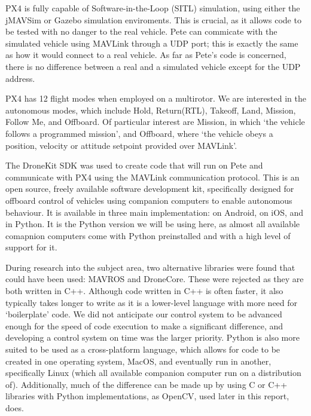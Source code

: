 \documentclass[11pt]{article}
\begin{document}
PX4 is fully capable of Software-in-the-Loop (SITL) simulation, using either the jMAVSim or Gazebo simulation enviroments.\cite{PX4_dev_guide} This is crucial, as it allows code to be tested with no danger to the real vehicle. Pete can commicate with the simulated vehicle using MAVLink through a UDP port; this is exactly the same as how it would connect to a real vehicle. As far as Pete's code is concerned, there is no difference between a real and a simulated vehicle except for the UDP address.


PX4 has 12 flight modes when employed on a multirotor. We are interested in the autonomous modes, which include Hold, Return(RTL), Takeoff, Land, Mission, Follow Me, and Offboard. Of particular interest are Mission, in which `the vehicle follows a programmed mission', and Offboard, where `the vehicle obeys a position, velocity or attitude setpoint provided over MAVLink'.\cite{PX4_user_guide}

The DroneKit SDK was used to create code that will run on Pete and communicate with PX4 using the MAVLink communication protocol. This is an open source, freely available software development kit, specifically designed for offboard control of vehicles using companion computers to enable autonomous behaviour. It is available in three main implementation: on Android, on iOS, and in Python. It is the Python version we will be using here, as almost all available comapnion computers come with Python preinstalled and with a high level of support for it.

During research into the subject area, two alternative libraries were found that could have been used: MAVROS and DroneCore. These were rejected as they are both written in C++. Although code written in C++ is often faster, it also typically takes longer to write as it is a lower-level language with more need for `boilerplate' code. We did not anticipate our control system to be advanced enough for the speed of code execution to make a significant difference, and developing a control system on time was the larger priority. Python is also more suited to be used as a cross-platform language, which allows for code to be created in one operating system, MacOS, and eventually run in another, specifically Linux (which all available companion computer run on a distribution of).
Additionally, much of the difference can be made up by using C or C++ libraries with Python implementations, as OpenCV, used later in this report, does.
\end{document}
